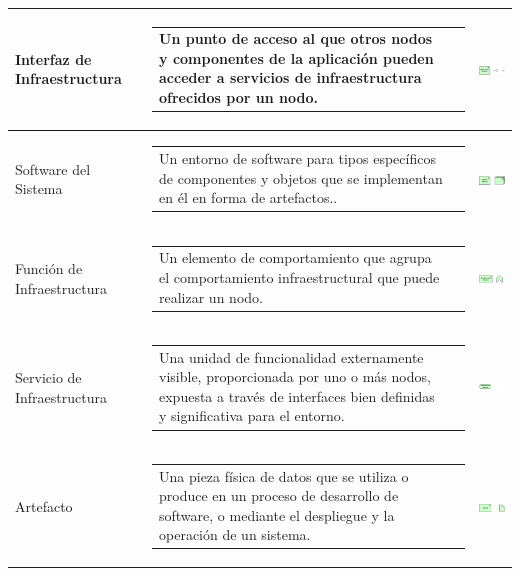 \begin{longtable}[c]{|p{2.55cm}|l|c|}
	Interfaz de Infraestructura	& \begin{tabular}[c]{p{7cm}@{}l@{}}Un punto de acceso al que otros nodos y componentes de la aplicación pueden acceder a servicios de infraestructura ofrecidos por un nodo.\end{tabular} & \includegraphics[width=35mm]{arquitectura/adm_lenguaje/imgs/technology/InfrastructureInterface}          \\ \hline
	Software del Sistema   		& \begin{tabular}[c]{p{7cm}@{}l@{}}Un entorno de software para tipos específicos de componentes y objetos que se implementan en él en forma de artefactos..\end{tabular} & \includegraphics[width=35mm]{arquitectura/adm_lenguaje/imgs/technology/SystemSoftware}          \\ \hline
	Función de Infraestructura	& \begin{tabular}[c]{p{7cm}@{}l@{}}Un elemento de comportamiento que agrupa el comportamiento infraestructural que puede realizar un nodo.\end{tabular} & \includegraphics[width=35mm]{arquitectura/adm_lenguaje/imgs/technology/InfrastructureFunction}          \\ \hline		
	Servicio de Infraestructura	& \begin{tabular}[c]{p{7cm}@{}l@{}}Una unidad de funcionalidad externamente visible, proporcionada por uno o más nodos, expuesta a través de interfaces bien definidas y significativa para el entorno.\end{tabular} & \includegraphics[width=35mm]{arquitectura/adm_lenguaje/imgs/technology/InfrastructureService}          \\ \hline
	Artefacto				   	& \begin{tabular}[c]{p{7cm}@{}l@{}}Una pieza física de datos que se utiliza o produce en un proceso de desarrollo de software, o mediante el despliegue y la operación de un sistema.\end{tabular} & \includegraphics[width=35mm]{arquitectura/adm_lenguaje/imgs/technology/Artifact}          \\ \hline
\end{longtable}

